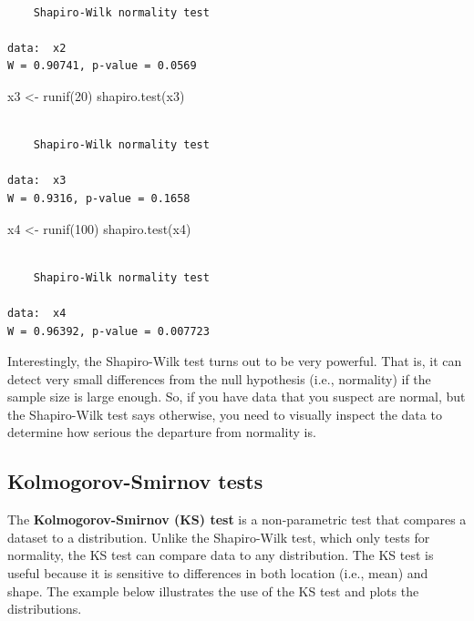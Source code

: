 \documentclass[
  13,
  letterpaper,
]{report}
\newenvironment{Shaded}{\begin{snugshade}}{\end{snugshade}}
\newcommand{\DecValTok}[1]{\textcolor[rgb]{0.68,0.00,0.00}{#1}}
\newcommand{\FunctionTok}[1]{\textcolor[rgb]{0.28,0.35,0.67}{#1}}
\newcommand{\NormalTok}[1]{\textcolor[rgb]{0.00,0.23,0.31}{#1}}
\newcommand{\OtherTok}[1]{\textcolor[rgb]{0.00,0.23,0.31}{#1}}
\begin{document}
\begin{verbatim}

    Shapiro-Wilk normality test

data:  x2
W = 0.90741, p-value = 0.0569
\end{verbatim}

\begin{Shaded}
\begin{Highlighting}[]
\NormalTok{x3 }\OtherTok{\textless{}{-}} \FunctionTok{runif}\NormalTok{(}\DecValTok{20}\NormalTok{)}
\FunctionTok{shapiro.test}\NormalTok{(x3)}
\end{Highlighting}
\end{Shaded}

\begin{verbatim}

    Shapiro-Wilk normality test

data:  x3
W = 0.9316, p-value = 0.1658
\end{verbatim}

\begin{Shaded}
\begin{Highlighting}[]
\NormalTok{x4 }\OtherTok{\textless{}{-}} \FunctionTok{runif}\NormalTok{(}\DecValTok{100}\NormalTok{)}
\FunctionTok{shapiro.test}\NormalTok{(x4)}
\end{Highlighting}
\end{Shaded}

\begin{verbatim}

    Shapiro-Wilk normality test

data:  x4
W = 0.96392, p-value = 0.007723
\end{verbatim}

Interestingly, the Shapiro-Wilk test turns out to be very powerful. That
is, it can detect very small differences from the null hypothesis (i.e.,
normality) if the sample size is large enough. So, if you have data that
you suspect are normal, but the Shapiro-Wilk test says otherwise, you
need to visually inspect the data to determine how serious the departure
from normality is.

\subsection{Kolmogorov-Smirnov tests}\label{sec-dtest-tests-ks}

The \textbf{Kolmogorov-Smirnov (KS) test} is a non-parametric test that
compares a dataset to a distribution. Unlike the Shapiro-Wilk test,
which only tests for normality, the KS test can compare data to any
distribution. The KS test is useful because it is sensitive to
differences in both location (i.e., mean) and shape. The example below
illustrates the use of the KS test and plots the distributions.
\end{document}
